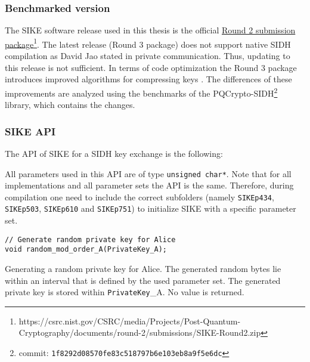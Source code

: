 \subsubsection{Benchmarked version}
The \gls{SIKE} software release used in this thesis is the official \href{https://csrc.nist.gov/CSRC/media/Projects/Post-Quantum-Cryptography/documents/round-2/submissions/SIKE-Round2.zip}{Round 2 submission package}\footnote{https://csrc.nist.gov/CSRC/media/Projects/Post-Quantum-Cryptography/documents/round-2/submissions/SIKE-Round2.zip}. The latest release (Round 3 package) does not support native SIDH compilation as David Jao stated in private communication. Thus, updating to this release is not sufficient. In terms of code optimization the Round 3 package introduces improved algorithms for compressing keys \parencite{sike2020spec}. The differences of these improvements are analyzed using the benchmarks of the \gls{PQCrypto-SIDH}\footnote{commit: \texttt{1f8292d08570fe83c518797b6e103eb8a9f5e6dc}} library, which contains the changes.

\subsubsection{\gls{SIKE} API}
The API of \gls{SIKE} for a \gls{SIDH} key exchange is the following:

All parameters used in this API are of type \texttt{unsigned char*}. Note that for all implementations and all parameter sets the API is the same. Therefore, during compilation one need to include the correct subfolders (namely \texttt{SIKEp434}, \texttt{SIKEp503}, \texttt{SIKEp610} and \texttt{SIKEp751}) to initialize \gls{SIKE} with a specific parameter set.


\begin{lstlisting}[]
// Generate random private key for Alice
void random_mod_order_A(PrivateKey_A);
\end{lstlisting}
Generating a random private key for Alice. The generated random bytes lie within an interval that is defined by the used parameter set. The generated private key is stored within \textcolor{keywordcol}{\texttt{PrivateKey}\_A}. No value is returned.\\

